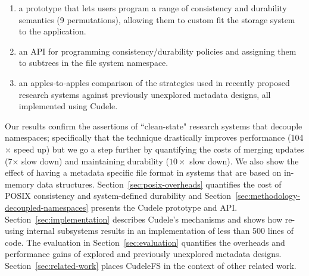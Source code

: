 \begin{enumerate}

  \item a prototype that lets users program a range of
  consistency and durability semantics (9 permutations), allowing them to custom
  fit the storage system to the application.

  \item an API for programming consistency/durability policies and assigning
  them to subtrees in the file system namespace.

  \item an apples-to-apples comparison of the strategies used in recently proposed research systems against
  previously unexplored metadata designs, all implemented using Cudele.

\end{enumerate}

Our results confirm the assertions of ``clean-state" research systems that
decouple namespaces; specifically that the technique drastically improves
performance (104\(\times\) speed up) but we go a step further by quantifying
the costs of merging updates (7\(\times\) slow down) and maintaining durability
(\(10\times\) slow down). We also show the effect of having a metadata specific
file format in systems that are based on in-memory data structures.
Section~\ref{sec:posix-overheads} quantifies the cost of POSIX
consistency and system-defined durability and
Section~\ref{sec:methodology-decoupled-namespaces} presents the Cudele
prototype and API. Section~\ref{sec:implementation} describes Cudele's
mechanisms and shows how re-using internal subsystems results in an
implementation of less than 500 lines of code. The evaluation in
Section~\ref{sec:evaluation} quantifies the overheads and performance gains of
explored and previously unexplored metadata designs.
Section~\ref{sec:related-work} places CudeleFS in the context of other related
work.

